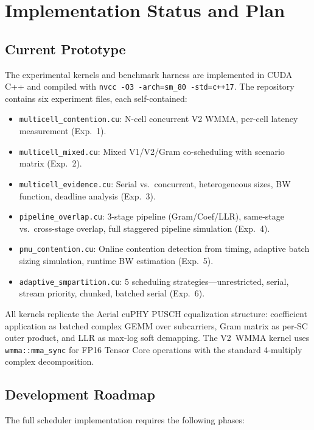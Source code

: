 \section{Implementation Status and Plan}
\label{sec:implementation}

\subsection{Current Prototype}

The experimental kernels and benchmark harness are implemented in CUDA C++ and compiled with \texttt{nvcc -O3 -arch=sm\_80 -std=c++17}. The repository contains six experiment files, each self-contained:

\begin{itemize}[leftmargin=*,nosep]
\item \texttt{multicell\_contention.cu}: N-cell concurrent V2 WMMA, per-cell latency measurement (Exp.~1).
\item \texttt{multicell\_mixed.cu}: Mixed V1/V2/Gram co-scheduling with scenario matrix (Exp.~2).
\item \texttt{multicell\_evidence.cu}: Serial vs.\ concurrent, heterogeneous sizes, BW function, deadline analysis (Exp.~3).
\item \texttt{pipeline\_overlap.cu}: 3-stage pipeline (Gram/Coef/LLR), same-stage vs.\ cross-stage overlap, full staggered pipeline simulation (Exp.~4).
\item \texttt{pmu\_contention.cu}: Online contention detection from timing, adaptive batch sizing simulation, runtime BW estimation (Exp.~5).
\item \texttt{adaptive\_smpartition.cu}: 5 scheduling strategies---unrestricted, serial, stream priority, chunked, batched serial (Exp.~6).
\end{itemize}

All kernels replicate the Aerial cuPHY PUSCH equalization structure: coefficient application as batched complex GEMM over subcarriers, Gram matrix as per-SC outer product, and LLR as max-log soft demapping. The V2~WMMA kernel uses \texttt{wmma::mma\_sync} for FP16 Tensor Core operations with the standard 4-multiply complex decomposition.

\subsection{Development Roadmap}

The full scheduler implementation requires the following phases:


